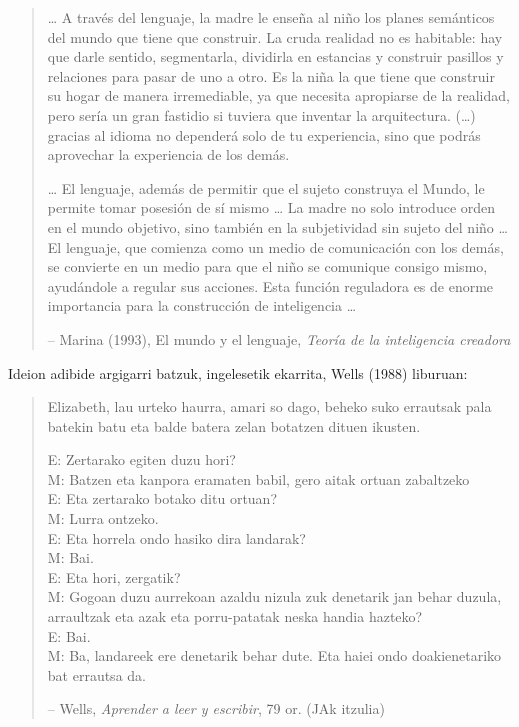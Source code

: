 \documentclass[
]{book}
\begin{document}
\begin{quote}
\ldots{} A través del lenguaje, la madre le enseña al niño los planes semánticos del mundo que tiene que construir. La cruda realidad no es habitable: hay que darle sentido, segmentarla, dividirla en estancias y construir pasillos y relaciones para pasar de uno a otro. Es la niña la que tiene que construir su hogar de manera irremediable, ya que necesita apropiarse de la realidad, pero sería un gran fastidio si tuviera que inventar la arquitectura. (\ldots) gracias al idioma no dependerá solo de tu experiencia, sino que podrás aprovechar la experiencia de los demás.

\ldots{} El lenguaje, además de permitir que el sujeto construya el Mundo, le permite tomar posesión de sí mismo \ldots{} La madre no solo introduce orden en el mundo objetivo, sino también en la subjetividad sin sujeto del niño \ldots{} El lenguaje, que comienza como un medio de comunicación con los demás, se convierte en un medio para que el niño se comunique consigo mismo, ayudándole a regular sus acciones. Esta función reguladora es de enorme importancia para la construcción de inteligencia \ldots{}

-- Marina (1993), El mundo y el lenguaje, \emph{Teoría de la inteligencia creadora}
\end{quote}

Ideion adibide argigarri batzuk, ingelesetik ekarrita, Wells (1988) liburuan:

\begin{quote}
Elizabeth, lau urteko haurra, amari so dago, beheko suko errautsak pala batekin batu eta balde batera zelan botatzen dituen ikusten.

E: Zertarako egiten duzu hori?\\
M: Batzen eta kanpora eramaten babil, gero aitak ortuan zabaltzeko\\
E: Eta zertarako botako ditu ortuan?\\
M: Lurra ontzeko.\\
E: Eta horrela ondo hasiko dira landarak?\\
M: Bai.\\
E: Eta hori, zergatik?\\
M: Gogoan duzu aurrekoan azaldu nizula zuk denetarik jan behar duzula, arraultzak eta azak eta porru-patatak neska handia hazteko?\\
E: Bai.\\
M: Ba, landareek ere denetarik behar dute. Eta haiei ondo doakienetariko bat errautsa da.

-- Wells, \emph{Aprender a leer y escribir}, 79 or. (JAk itzulia)
\end{quote}
\end{document}
